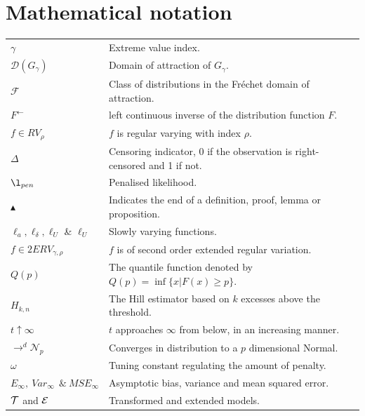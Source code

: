 \chapter*{Mathematical notation}
\thispagestyle{empty}
\begin{tabular}{p{4cm}p{12cm}}
$\gamma$ & Extreme value index.\\
$\mathcal{D}(G_{\gamma})$ & Domain of attraction of $G_{\gamma}$.\\
$\mathcal{F}$ & Class of distributions in the Fréchet domain of attraction.\\
$F^{\leftarrow}$ &	left continuous inverse of the distribution function $F$.\\
$f\in RV_{\rho}$ & $f$ is regular varying with index $\rho$.\\
$\Delta$ & Censoring indicator, 0 if the observation is right-censored and 1 if not.\\
$\l_{pen}$ & Penalised likelihood.\\
$\blacktriangle$ & Indicates the end of a definition, proof, lemma or proposition.\\
$\ell_{a}, \ell_{\delta}, \ell_U$ \& $\ell_U$ & Slowly varying functions.\\
$f\in 2ERV_{\gamma,\rho}$ &  $f$ is of second order extended regular variation.\\
$Q(p)$ & The quantile function denoted by $Q(p)=\inf\{x|F(x)\geq p\}$.\\
$H_{k,n}$ & The Hill estimator based on $k$ excesses above the threshold.\\
$t\uparrow \infty$ & $t$ approaches $\infty$ from below, in an increasing manner.\\
$\to^d \mathcal{N}_p$ & Converges in distribution to a $p$ dimensional Normal.\\
$\omega$ & Tuning constant regulating the amount of penalty.\\
$E_{\infty},\ Var_{\infty}\ \ \&\ MSE_{\infty}$ & Asymptotic bias, variance and mean squared error.\\
${\cal T}$ and ${\cal E}$ & Transformed and extended models.
\end{tabular}
\cleardoublepage
\tableofcontents
\newpage
\listoffigures
\newpage
\listoftables
\newpage
\clearpage

\newpage
